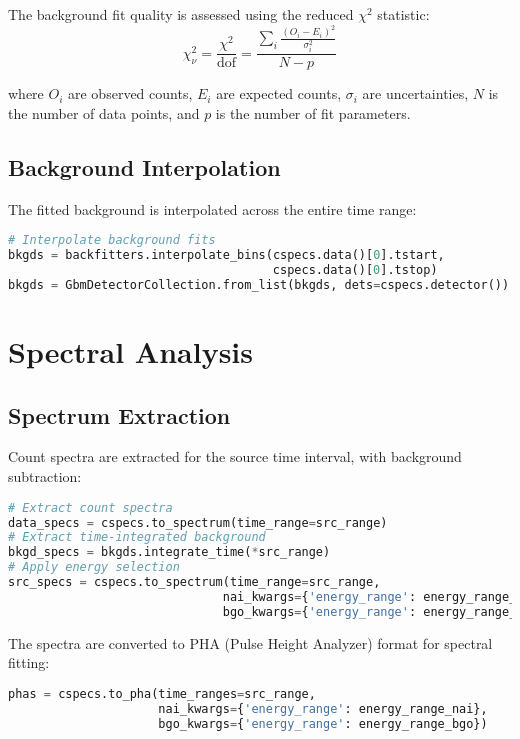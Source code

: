 \documentclass{article}
\begin{document}
The background fit quality is assessed using the reduced $\chi^2$ statistic:
\begin{equation}
\chi^2_{\nu} = \frac{\chi^2}{\text{dof}} = \frac{\sum_{i} \frac{(O_i - E_i)^2}{\sigma_i^2}}{N - p}
\end{equation}

where $O_i$ are observed counts, $E_i$ are expected counts, $\sigma_i$ are uncertainties, $N$ is the number of data points, and $p$ is the number of fit parameters.

\subsection{Background Interpolation}

The fitted background is interpolated across the entire time range:

\begin{lstlisting}[language=Python]
# Interpolate background fits
bkgds = backfitters.interpolate_bins(cspecs.data()[0].tstart, 
                                     cspecs.data()[0].tstop)
bkgds = GbmDetectorCollection.from_list(bkgds, dets=cspecs.detector())
\end{lstlisting}

\section{Spectral Analysis}

\subsection{Spectrum Extraction}

Count spectra are extracted for the source time interval, with background subtraction:

\begin{lstlisting}[language=Python]
# Extract count spectra
data_specs = cspecs.to_spectrum(time_range=src_range)
# Extract time-integrated background
bkgd_specs = bkgds.integrate_time(*src_range)
# Apply energy selection
src_specs = cspecs.to_spectrum(time_range=src_range, 
                              nai_kwargs={'energy_range': energy_range_nai}, 
                              bgo_kwargs={'energy_range': energy_range_bgo})
\end{lstlisting}

The spectra are converted to PHA (Pulse Height Analyzer) format for spectral fitting:

\begin{lstlisting}[language=Python]
phas = cspecs.to_pha(time_ranges=src_range, 
                     nai_kwargs={'energy_range': energy_range_nai}, 
                     bgo_kwargs={'energy_range': energy_range_bgo})
\end{lstlisting}
\end{document}
